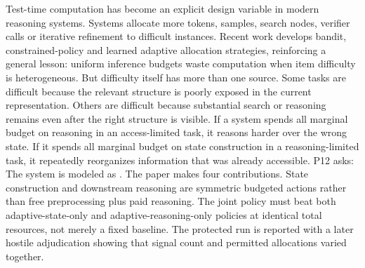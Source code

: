 \markdownRendererDocumentBegin
\markdownRendererSectionBegin
{}\markdownRendererInterblockSeparator
{}Test-time computation has become an explicit design variable in modern reasoning systems. Systems allocate more tokens, samples, search nodes, verifier calls or iterative refinement to difficult instances. Recent work develops bandit, constrained-policy and learned adaptive allocation strategies, reinforcing a general lesson: uniform inference budgets waste computation when item difficulty is heterogeneous.\markdownRendererInterblockSeparator
{}But difficulty itself has more than one source. Some tasks are difficult because the relevant structure is poorly exposed in the current representation. Others are difficult because substantial search or reasoning remains even after the right structure is visible. If a system spends all marginal budget on reasoning in an access-limited task, it reasons harder over the wrong state. If it spends all marginal budget on state construction in a reasoning-limited task, it repeatedly reorganizes information that was already accessible.\markdownRendererInterblockSeparator
{}P12 asks:\markdownRendererInterblockSeparator
{}\markdownRendererBlockQuoteBegin
{}
\markdownRendererBlockQuoteEnd \markdownRendererInterblockSeparator
{}The system is modeled as\markdownRendererInterblockSeparator
{}.\markdownRendererInterblockSeparator
{}The paper makes four contributions.\markdownRendererInterblockSeparator
{}\markdownRendererOlBeginTight
{} State construction and downstream reasoning are symmetric budgeted actions rather than free preprocessing plus paid reasoning.\markdownRendererOlItemEnd
{} The joint policy must beat both adaptive-state-only and adaptive-reasoning-only policies at identical total resources, not merely a fixed baseline.\markdownRendererOlItemEnd
{} The protected run is reported with a later hostile adjudication showing that signal count and permitted allocations varied together.\markdownRendererOlItemEnd
